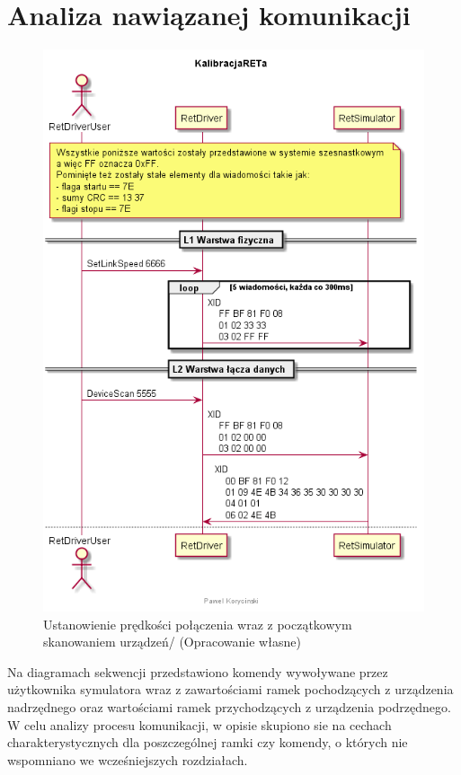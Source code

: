 \chapter{Analiza nawiązanej komunikacji}
    \begin{figure}[h!]
    \centering
    \includegraphics[scale=0.70]{out/Diagramy/UML_DiagramOfSequence_New/KalibracjaRETa-page1.png}
    \caption{Ustanowienie prędkości połączenia wraz z początkowym skanowaniem urządzeń/
        \newline(Opracowanie własne)}
    \end{figure}
    \newpage

    Na diagramach sekwencji przedstawiono komendy wywoływane przez użytkownika
    symulatora wraz z zawartościami ramek pochodzących z urządzenia nadrzędnego oraz
    wartościami ramek przychodzących z urządzenia podrzędnego.
    W celu analizy procesu komunikacji, w opisie skupiono sie na cechach charakterystycznych
    dla poszczególnej ramki czy komendy, o których nie wspomniano we wcześniejszych rozdziałach.
    
